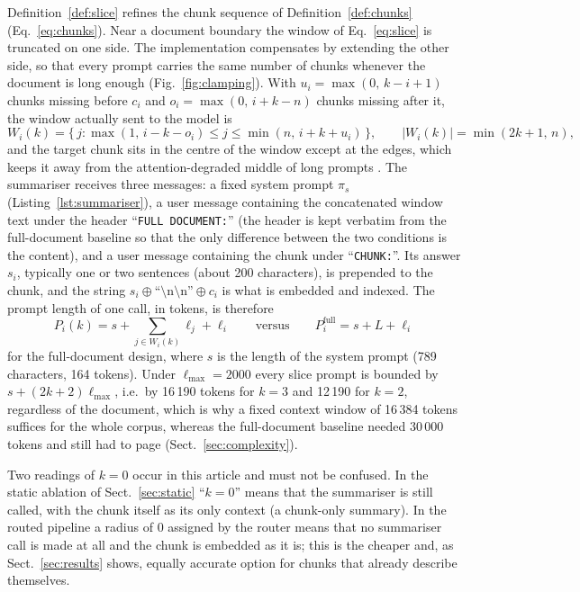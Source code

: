 \documentclass[pdflatex,sn-mathphys-num]{sn-jnl}
\theoremstyle{thmstyleone}%
\theoremstyle{thmstylethree}%
\begin{document}
Definition~\ref{def:slice} refines the chunk sequence of Definition~\ref{def:chunks} (Eq.~\eqref{eq:chunks}). Near a document boundary the window of Eq.~\eqref{eq:slice} is truncated on one side. The implementation compensates by extending the other side, so that every prompt carries the same number of chunks whenever the document is long enough (Fig.~\ref{fig:clamping}). With $u_i=\max(0,\,k-i+1)$ chunks missing before $c_i$ and $o_i=\max(0,\,i+k-n)$ chunks missing after it, the window actually sent to the model is
\begin{equation}\label{eq:window}
W_i(k)=\bigl\{\,j : \max(1,\,i-k-o_i)\le j\le \min(n,\,i+k+u_i)\,\bigr\},\qquad |W_i(k)|=\min(2k+1,\,n),
\end{equation}
and the target chunk sits in the centre of the window except at the edges, which keeps it away from the attention-degraded middle of long prompts \cite{liu2023lostmiddlelanguagemodels}. The summariser receives three messages: a fixed system prompt $\pi_s$ (Listing~\ref{lst:summariser}), a user message containing the concatenated window text under the header ``\texttt{FULL DOCUMENT:}'' (the header is kept verbatim from the full-document baseline so that the only difference between the two conditions is the content), and a user message containing the chunk under ``\texttt{CHUNK:}''. Its answer $s_i$, typically one or two sentences (about 200 characters), is prepended to the chunk, and the string $s_i \oplus \text{``\textbackslash n\textbackslash n''} \oplus c_i$ is what is embedded and indexed. The prompt length of one call, in tokens, is therefore
\begin{equation}\label{eq:prompt}
P_i(k)=s+\sum_{j\in W_i(k)}\ell_j+\ell_i \qquad\text{versus}\qquad P_i^{\mathrm{full}}=s+L+\ell_i
\end{equation}
for the full-document design, where $s$ is the length of the system prompt (789 characters, 164 tokens). Under $\ell_{\max}=2000$ every slice prompt is bounded by $s+(2k+2)\ell_{\max}$, i.e.\ by 16\,190 tokens for $k=3$ and 12\,190 for $k=2$, regardless of the document, which is why a fixed context window of 16\,384 tokens suffices for the whole corpus, whereas the full-document baseline needed 30\,000 tokens and still had to page (Sect.~\ref{sec:complexity}).

Two readings of $k=0$ occur in this article and must not be confused. In the static ablation of Sect.~\ref{sec:static} ``$k=0$'' means that the summariser is still called, with the chunk itself as its only context (a chunk-only summary). In the routed pipeline a radius of $0$ assigned by the router means that no summariser call is made at all and the chunk is embedded as it is; this is the cheaper and, as Sect.~\ref{sec:results} shows, equally accurate option for chunks that already describe themselves.
\end{document}
